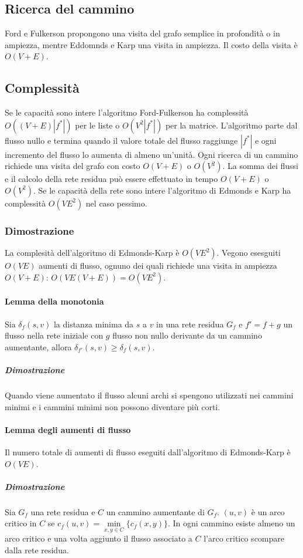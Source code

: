\subsection{Ricerca del cammino}
Ford e Fulkerson propongono una visita del grafo semplice in profondit\`a o in ampiezza, mentre Eddomnds e Karp una visita in ampiezza. Il costo della visita \`e $O(V+E)$.
\subsection{Complessit\`a}
Se le capacit\`a sono intere l'algoritmo Ford-Fulkerson ha complessit\`a $O((V+E)|f^*|)$ per le liste o $O(V^2|f^*|)$ per la matrice. L'algoritmo parte dal flusso nullo e termina quando
il valore totale del flusso raggiunge $|f^*|$ e ogni incremento del flusso lo aumenta di almeno un'unit\`a. Ogni ricerca di un cammino richiede una visita del grafo con costo
$O(V+E)$ o $O(V^2)$. La somma dei flussi e il calcolo della rete residua pu\`o essere effettuato in tempo $O(V+E)$ o $O(V^2)$. Se le capacit\`a della rete sono intere l'algoritmo di 
Edmonds e Karp ha complessit\`a $O(VE^2)$ nel caso pessimo. 
\subsubsection{Dimostrazione}
La complesit\`a dell'algoritmo di Edmonds-Karp \`e $O(VE^2)$. Vegono esesguiti $O(VE)$ aumenti di flusso, ognuno dei quali richiede una visita in ampiezza $O(V+E)$: $O(VE(V+E))=O(VE^2)$.
\paragraph{Lemma della monotonia}
Sia $\delta_f(s, v)$ la distanza minima da $s$ a $v$ in una rete residua $G_f$ e $f' = f+g$ un flusso nella rete iniziale con $g$ flusso non nullo derivante da un cammino aumentante, 
allora $\delta_{f'}(s, v)\ge \delta_f(s, v)$. 
\subparagraph{Dimostrazione}
Quando viene aumentato il flusso alcuni archi si spengono utilizzati nei cammini minimi e i cammini minimi non possono diventare pi\`u corti. 
\paragraph{Lemma degli aumenti di flusso}
Il numero totale di aumenti di flusso eseguiti dall'algoritmo di Edmonds-Karp \`e $O(VE)$. 
\subparagraph{Dimostrazione}
Sia $G_f$ una rete residua e $C$ un cammino aumentante di $G_f$. $(u, v)$ \`e un arco critico in $C$ se $c_f(u, v) = \min\limits_{x, y\in C}\{c_f(x, y)\}$. In ogni cammino esiste almeno
un arco critico e una volta aggiunto il flusso associato a $C$ l'arco critico scompare dalla rete residua. 
